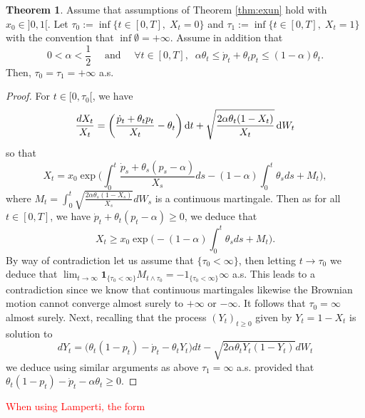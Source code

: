 \documentclass[11pt]{article}
\theoremstyle{definition}
\newtheorem{Thm}[Def]{Theorem}
\begin{document}
\begin{Thm}
Assume that assumptions of Theorem \ref{thm:exun} hold with $x_0\in]0,1[$.
Let $\tau_0:=\inf \{t\in[0,T],\; X_t=0\}$ and  $\tau_1:=\inf \{t\in[0,T],\; X_t=1\}$ with the convention that $\inf\emptyset=+\infty$. Assume in addition that
\begin{equation}\label{Assumption:2}
0<\alpha < \frac 12\quad \mbox{ and }\quad \forall  t\in[0,T],\;\; \alpha\theta_t\le \dot p_t +\theta_tp_t \le (1-\alpha)\theta_t \tag{B}. 
\end{equation}
 Then, $\tau_0=\tau_1=+\infty$ a.s.
\end{Thm}
\begin{proof}
For $t\in[0,\tau_0[$, we have 
$$
\frac{dX_t}{X_t}=\left( \frac{\dot p_t +\theta_t p_t}{X_t} - \theta_t\right)\dif t  +\sqrt{\frac{2\alpha \theta_t(1-X_t)}{X_t}} \dif W_t 
$$  
so that
$$
X_t=x_0\exp\Big(\int_0^t \frac{\dot p_s +\theta_s(p_s-\alpha)}{X_s}ds-(1-\alpha)\int_0^t\theta_sds + M_t\Big),
$$
where $M_t=\int_0^t\sqrt{\frac{2\alpha \theta_s(1-X_s)}{X_s}} dW_s$ is a continuous martingale. Then as for all $t\in[0,T]$, we have $\dot p_t +\theta_t(p_t-\alpha)\ge0$, we deduce that
$$
X_t\ge x_0\exp\Big(-(1-\alpha)\int_0^t\theta_sds + M_t\Big).
$$
By way of contradiction let us assume that  $\{\tau_0<\infty\}$, then letting $t\to \tau_0$ we deduce that $\lim_{t\to \infty} \mathbf 1_{\{\tau_0<\infty\}}M_{t\wedge \tau_0}=\mathbf -1_{\{\tau_0<\infty\}}\infty$ a.s. This leads to a contradiction since we know that continuous martingales likewise the Brownian motion cannot converge  almost surely to $+\infty$ or $-\infty$. It follows that $\tau_0=\infty$ almost surely. Next, recalling that  the process $(Y_t)_{t\geq 0}$  given by $Y_t=1-X_t$ is solution to 
$$
dY_t= \big( \theta_t(1-p_t) -\dot p_t - \theta_tY_t  \big)dt  -\sqrt{2\alpha \theta_tY_t(1-Y_t)} dW_t 
$$
we deduce using similar arguments as above 
$\tau_1=\infty$ a.s. provided that $\theta_t(1-p_t) -\dot p_t -\alpha \theta_t\ge 0$.
 \end{proof}
\textcolor{red}{When using Lamperti, the form }


\nocite{*}
 
\printbibliography[keyword={Wind-SDE},title={References}]
\end{document}

